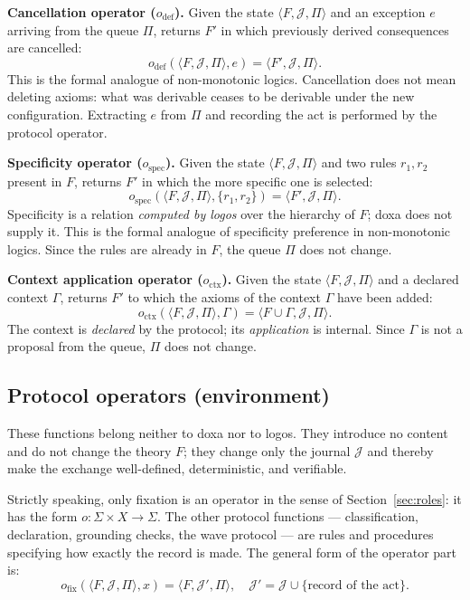 \documentclass[12pt,a4paper]{article}
\begin{document}
\textbf{Cancellation operator ($o_{\text{def}}$).} Given the state
$\langle F, \mathcal{J}, \Pi \rangle$ and an exception $e$ arriving from the
queue $\Pi$, returns $F'$ in which previously derived consequences are
cancelled:
\[
o_{\text{def}}(\langle F, \mathcal{J}, \Pi \rangle, e)
= \langle F', \mathcal{J}, \Pi \rangle.
\]
This is the formal analogue of non-monotonic logics. Cancellation does not
mean deleting axioms: what was derivable ceases to be derivable under the new
configuration. Extracting $e$ from $\Pi$ and recording the act is performed
by the protocol operator.

\textbf{Specificity operator ($o_{\text{spec}}$).} Given the state
$\langle F, \mathcal{J}, \Pi \rangle$ and two rules $r_1, r_2$ present in $F$,
returns $F'$ in which the more specific one is selected:
\[
o_{\text{spec}}(\langle F, \mathcal{J}, \Pi \rangle, \{r_1, r_2\})
= \langle F', \mathcal{J}, \Pi \rangle.
\]
Specificity is a relation \emph{computed by logos} over the hierarchy of $F$;
doxa does not supply it. This is the formal analogue of specificity preference
in non-monotonic logics. Since the rules are already in $F$, the queue $\Pi$
does not change.

\textbf{Context application operator ($o_{\text{ctx}}$).} Given the state
$\langle F, \mathcal{J}, \Pi \rangle$ and a declared context $\Gamma$, returns
$F'$ to which the axioms of the context $\Gamma$ have been added:
\[
o_{\text{ctx}}(\langle F, \mathcal{J}, \Pi \rangle, \Gamma)
= \langle F \cup \Gamma, \mathcal{J}, \Pi \rangle.
\]
The context is \emph{declared} by the protocol; its \emph{application} is
internal. Since $\Gamma$ is not a proposal from the queue, $\Pi$ does not
change.

\subsection{Protocol operators (environment)}
\label{sec:protocol}

These functions belong neither to doxa nor to logos. They introduce no content
and do not change the theory $F$; they change only the journal $\mathcal{J}$
and thereby make the exchange well-defined, deterministic, and verifiable.

Strictly speaking, only fixation is an operator in the sense of
Section~\ref{sec:roles}: it has the form $o: \Sigma \times X \to \Sigma$. The
other protocol functions --- classification, declaration, grounding checks,
the wave protocol --- are rules and procedures specifying how exactly the
record is made. The general form of the operator part is:
\[
o_{\text{fix}}(\langle F, \mathcal{J}, \Pi \rangle, x)
= \langle F, \mathcal{J}', \Pi \rangle,
\quad \mathcal{J}' = \mathcal{J} \cup \{\text{record of the act}\}.
\]
\end{document}
